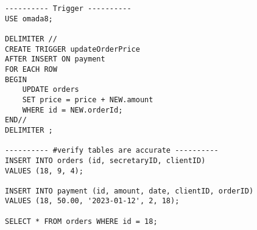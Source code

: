 \begin{lstlisting}
---------- Trigger ----------
USE omada8;

DELIMITER //
CREATE TRIGGER updateOrderPrice
AFTER INSERT ON payment
FOR EACH ROW
BEGIN
    UPDATE orders
    SET price = price + NEW.amount
    WHERE id = NEW.orderId;
END//
DELIMITER ;

---------- #verify tables are accurate ----------
INSERT INTO orders (id, secretaryID, clientID)
VALUES (18, 9, 4);

INSERT INTO payment (id, amount, date, clientID, orderID)
VALUES (18, 50.00, '2023-01-12', 2, 18);

SELECT * FROM orders WHERE id = 18;
\end{lstlisting}